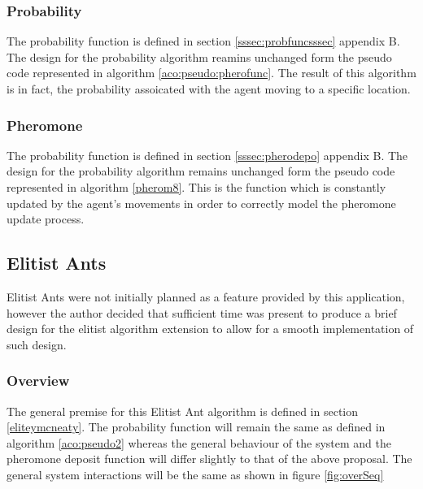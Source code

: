 \subsubsection{Probability}

The probability function is defined in section \ref{sssec:probfuncsssec} appendix B. The design for the probability algorithm reamins unchanged form the pseudo code represented in algorithm \ref{aco:pseudo:pherofunc}. The result of this algorithm is in fact, the probability assoicated with the agent moving to a specific location.

\subsubsection{Pheromone}

The probability function is defined in section \ref{sssec:pherodepo} appendix B. The design for the probability algorithm remains unchanged form the pseudo code represented in algorithm \ref{pherom8}. This is the function which is constantly updated by the agent’s movements in order to correctly model the pheromone update process.

\subsection{Elitist Ants}

Elitist Ants were not initially planned as a feature provided by this application, however the author decided that sufficient time was present to produce a brief design for the elitist algorithm extension to allow for a smooth implementation of such design.

\subsubsection{Overview}

The general premise for this Elitist Ant algorithm is defined in section \ref{eliteymcneaty}. The probability function will remain the same as defined in algorithm \ref{aco:pseudo2} whereas the general behaviour of the system and the pheromone deposit function will differ slightly to that of the above proposal. The general system interactions will be the same as shown in figure \ref{fig:overSeq}


